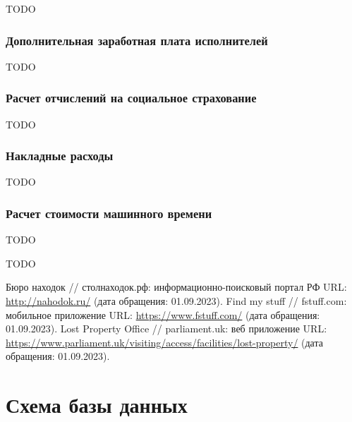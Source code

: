 \documentclass{mirea}
\begin{document}
TODO

\subsubsection{Дополнительная заработная плата исполнителей}

TODO

\subsubsection{Расчет отчислений на социальное страхование}

TODO

\subsubsection{Накладные расходы}

TODO

\subsubsection{Расчет стоимости машинного времени}

TODO


TODO



\begin{thebibliography}{99\kern\bibindent}
	 Бюро находок // столнаходок.рф: информационно-поисковый портал РФ URL: \url{http://nahodok.ru/} (дата обращения: 01.09.2023).
	 Find my stuff // fstuff.com: мобильное приложение URL: \url{https://www.fstuff.com/} (дата обращения: 01.09.2023).
	 Lost Property Office // parliament.uk: веб приложение URL: \url{https://www.parliament.uk/visiting/access/facilities/lost-property/} (дата обращения: 01.09.2023).
\end{thebibliography}



\appendix

\section{Схема базы данных}
\end{document}
